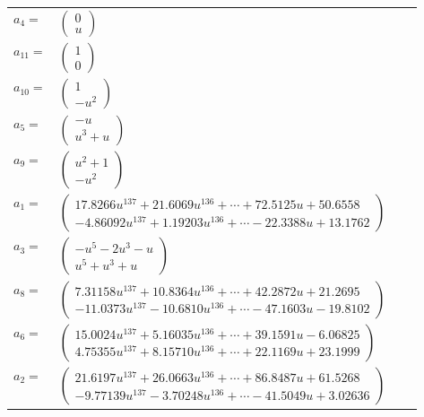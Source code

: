 \documentclass[1p]{elsarticle_modified}
\theoremstyle{definition}
\begin{document}
\begin{tabular}{m{7pt} m{180pt} m{7pt} m{180pt} }
\flushright $a_{4}=$&$\begin{pmatrix}0\\u\end{pmatrix}$ \\
\flushright $a_{11}=$&$\begin{pmatrix}1\\0\end{pmatrix}$ \\
\flushright $a_{10}=$&$\begin{pmatrix}1\\- u^2\end{pmatrix}$ \\
\flushright $a_{5}=$&$\begin{pmatrix}- u\\u^3+u\end{pmatrix}$ \\
\flushright $a_{9}=$&$\begin{pmatrix}u^2+1\\- u^2\end{pmatrix}$ \\
\flushright $a_{1}=$&$\begin{pmatrix}17.8266 u^{137}+21.6069 u^{136}+\cdots+72.5125 u+50.6558\\-4.86092 u^{137}+1.19203 u^{136}+\cdots-22.3388 u+13.1762\end{pmatrix}$ \\
\flushright $a_{3}=$&$\begin{pmatrix}- u^5-2 u^3- u\\u^5+u^3+u\end{pmatrix}$ \\
\flushright $a_{8}=$&$\begin{pmatrix}7.31158 u^{137}+10.8364 u^{136}+\cdots+42.2872 u+21.2695\\-11.0373 u^{137}-10.6810 u^{136}+\cdots-47.1603 u-19.8102\end{pmatrix}$ \\
\flushright $a_{6}=$&$\begin{pmatrix}15.0024 u^{137}+5.16035 u^{136}+\cdots+39.1591 u-6.06825\\4.75355 u^{137}+8.15710 u^{136}+\cdots+22.1169 u+23.1999\end{pmatrix}$ \\
\flushright $a_{2}=$&$\begin{pmatrix}21.6197 u^{137}+26.0663 u^{136}+\cdots+86.8487 u+61.5268\\-9.77139 u^{137}-3.70248 u^{136}+\cdots-41.5049 u+3.02636\end{pmatrix}$ \\

\end{tabular}
\end{document}
